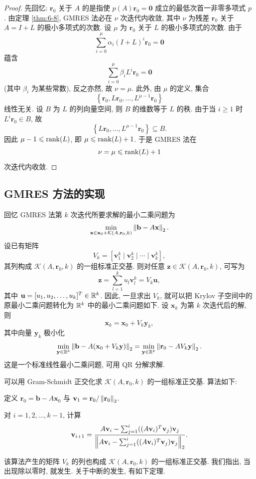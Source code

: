 \begin{proof}
先回忆: $\mathbf{r}_0$ 关于 $A$ 的是指使 $p(A)\mathbf{r}_0=\mathbf{0}$ 成立的最低次首一非零多项式 $p$ \cite{src:70}. 由定理 \ref{thm:6-8}, GMRES 法必在 $\nu$ 次迭代内收敛, 其中 $\nu$ 为残差 $\mathbf{r}_0$ 关于 $A=I+L$ 的极小多项式的次数. 设 $\mu$ 为 $\mathbf{r}_0$ 关于 $L$ 的极小多项式的次数. 由于
\[
  \sum_{i=0}^{\mu}\alpha_i(I+L)^i\mathbf{r}_0=\mathbf{0}
\]
蕴含
\[
  \sum_{i=0}^{\mu}\beta_iL^i\mathbf{r}_0=\mathbf{0}
\]
(其中 $\beta_i$ 为某些常数), 反之亦然, 故 $\nu=\mu$. 此外, 由 $\mu$ 的定义, 集合
\[
  \left\{\mathbf{r}_0,L\mathbf{r}_0,\ldots,L^{\mu-1}\mathbf{r}_0\right\}
\]
线性无关. 设 $B$ 为 $L$ 的列向量空间, 则 $B$ 的维数等于 $L$ 的秩. 由于当 $i\geqslant1$ 时 $L^i\mathbf{r}_0\in B$, 故
\[
  \left\{L\mathbf{r}_0,\ldots,L^{\mu-1}\mathbf{r}_0\right\}\subseteq B.
\]
因此 $\mu-1\leqslant\operatorname{rank}(L)$, 即 $\mu\leqslant\operatorname{rank}(L)+1$. 于是 GMRES 法在
\[
  \nu=\mu\leqslant\operatorname{rank}(L)+1
\]
次迭代内收敛.
\end{proof}

\subsection{GMRES 方法的实现}
\label{subsec:6-5-2}

回忆 GMRES 法第 $k$ 次迭代所要求解的最小二乘问题为
\[
  \min_{\mathbf{x}\in\mathbf{x}_0+\mathcal{K}(A,\mathbf{r}_0,k)}
  \left\|\mathbf{b}-A\mathbf{x}\right\|_2.
\]
设已有矩阵
\[
  V_k=\left[\mathbf{v}_1^k\mid\mathbf{v}_2^k\mid\cdots\mid\mathbf{v}_k^k\right],
\]
其列构成 $\mathcal{K}(A,\mathbf{r}_0,k)$ 的一组标准正交基. 则对任意 $\mathbf{z}\in\mathcal{K}(A,\mathbf{r}_0,k)$, 可写为
\[
  \mathbf{z}=\sum_{l=1}^{k}u_l\mathbf{v}_l^k=V_k\mathbf{u},
\]
其中 $\mathbf{u}=[u_1,u_2,\ldots,u_k]^T\in\mathbb{R}^k$. 因此, 一旦求出 $V_k$, 就可以把 Krylov 子空间中的原最小二乘问题转化为 $\mathbb{R}^k$ 中的最小二乘问题如下. 设 $\mathbf{x}_k$ 为第 $k$ 次迭代后的解, 则
\[
  \mathbf{x}_k=\mathbf{x}_0+V_k\mathbf{y}_k,
\]
其中向量 $\mathbf{y}_k$ 极小化
\[
  \min_{\mathbf{y}\in\mathbb{R}^k}\left\|\mathbf{b}-A(\mathbf{x}_0+V_k\mathbf{y})\right\|_2
  =\min_{\mathbf{y}\in\mathbb{R}^k}\left\|\mathbf{r}_0-AV_k\mathbf{y}\right\|_2.
\]
这是一个标准线性最小二乘问题, 可用 QR 分解求解.

可以用 Gram-Schmidt 正交化求 $\mathcal{K}(A,\mathbf{r}_0,k)$ 的一组标准正交基. 算法如下:
\begin{parenlist}
  \item 定义 $\mathbf{r}_0=\mathbf{b}-A\mathbf{x}_0$ 与
    $\mathbf{v}_1=\mathbf{r}_0/\left\|\mathbf{r}_0\right\|_2$.
  \item 对 $i=1,2,\ldots,k-1$, 计算
    \[
      \mathbf{v}_{i+1}
      =\frac{A\mathbf{v}_i-\sum_{j=1}^{i}
      ((A\mathbf{v}_i)^T\mathbf{v}_j)\mathbf{v}_j}
      {\left\|A\mathbf{v}_i-\sum_{j=1}^{i}
      ((A\mathbf{v}_i)^T\mathbf{v}_j)\mathbf{v}_j\right\|_2}.
    \]
\end{parenlist}
该算法产生的矩阵 $V_k$ 的列也构成 $\mathcal{K}(A,\mathbf{r}_0,k)$ 的一组标准正交基. 我们指出, 当出现除以零时, 就发生. 关于中断的发生, 有如下定理.

